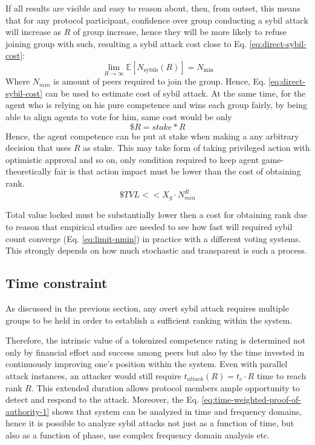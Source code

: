 \documentclass{article}
\begin{document}
\begin{CJK}{UTF8}{gbsn}
    If all results are visible and easy to reason about, then, from outset, this means that for any protocol participant, confidence over group conducting a sybil attack will increase as $R$ of group increase, hence they will be more likely to refuse joining group with such, resulting a sybil attack cost close to Eq. \ref{eq:direct-sybil-cost}:
    \begin{equation}
        \lim_{R \to \infty} \mathbb{E}[N_{\text{sybils}}(R)] = N_{\text{min}}
        \label{eq:limit-nmin}
    \end{equation} Where $N_{min}$ is amount of peers required to join the group. Hence, Eq. \ref{eq:direct-sybil-cost} can be used to estimate cost of sybil attack. At the same time, for the agent who is relying on his pure competence and wins each group fairly, by being able to align agents to vote for him, same cost would be only \begin{equation}
        \$R = stake*R
    \end{equation}
    Hence, the agent competence can be put at stake when making a any arbitrary decision that uses $R$ as stake. This may take form of taking privileged action with optimistic approval and so on, only condition required to keep agent game-theoretically fair is that action impact must be lower than the cost of obtaining rank.
    \begin{equation}
        \$TVL <<  X_g \cdot N_{min}^R
    \end{equation}

    Total value locked must be substantially lower then a cost for obtaining rank due to reason that empirical studies are needed to see how fast will required sybil count converge (Eq. \ref{eq:limit-nmin}) in practice with a different voting systems. This strongly depends on how much stochastic and transparent is such a process.


    \subsection{Time constraint}
    \label{sec:time-constraint}

    As discussed in the previous section, any overt sybil attack requires multiple groups to be held in order to establish a sufficient ranking within the system.

    Therefore, the intrinsic value of a tokenized competence rating is determined not only by financial effort and success among peers but also by the time invested in continuously improving one's position within the system. Even with parallel attack instances, an attacker would still require $t_{attack}(R) = t_c \cdot R$ time to reach rank $R$. This extended duration allows protocol members ample opportunity to detect and respond to the attack.
    Moreover, the Eq. \ref{eq:time-weighted-proof-of-authority-1} shows that system can be analyzed in time and frequency domains, hence it is possible to analyze sybil attacks not just as a function of time, but also as a function of phase, use complex frequency domain analysis etc.


\end{CJK}
\end{document}
